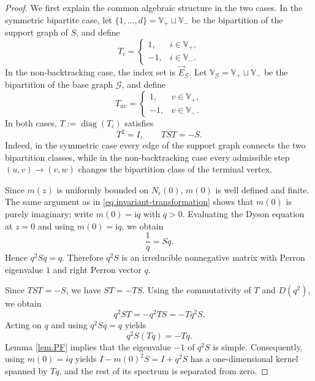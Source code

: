 \documentclass[11pt,twoside, a4paper]{article}
\numberwithin{equation}{section}
\numberwithin{figure}{section}
\theoremstyle{plain} %
\theoremstyle{definition}
\theoremstyle{remark}
\newcommand{\1} {\mspace{1 mu}}
\newcommand{\2} {\mspace{2 mu}}
\DeclareMathOperator{\diag}{diag}
\begin{document}
\begin{proof}
    We first explain the common algebraic structure in the two cases.
    In the symmetric bipartite case, let
    $
        \{1,\dots,d\}=\mathbb V_+\sqcup \mathbb{V}_-
    $
    be the bipartition of the support graph of \(S\), and define
    \[
        T_i=
        \begin{cases}
            1, & i\in\mathbb V_+,\\
            -1, & i\in\mathbb V_-.
        \end{cases}
    \]
    In the non-backtracking case, the index set is
    \(\vec E_{\mathcal G}\). Let 
    $
        \mathbb{V}_{\mathcal G}=\mathbb V_+\sqcup \mathbb V_-
    $
    be the bipartition of the base graph $\mathcal G$, and define
    \[
        T_{uv}
        =
        \begin{cases}
            1, & v\in\mathbb V_+,\\
            -1, & v\in\mathbb V_- .
        \end{cases}
    \]
    In both cases, \(T:=\diag(T_i)\) satisfies
    \begin{equation}\label{eq.period-two-structure}
        T^2=I,
        \qquad
        TST=-S .
    \end{equation}
    Indeed, in the symmetric case every edge of the support graph connects
    the two bipartition classes, while in the non-backtracking case every
    admissible step
    $
        (u,v)\to (v,w)
    $
    changes the bipartition class of the terminal vertex.


    Since $m(z)$ is uniformly bounded on $N_\epsilon(0)$, $m(0)$ is well defined and finite. 
    The same argument as in \eqref{eq.invariant-transformation} shows that \(m(0)\) is purely imaginary; write $m(0)=\mathrm iq$ with $q>0$.
    Evaluating the Dyson equation at \(z=0\) and using \(m(0)=\mathrm i q\), we obtain
    \[
        \frac1q = Sq .
    \]
    Hence
    $
        q^2S q=q.
    $
    Therefore \(q^2S\) is an irreducible nonnegative matrix with Perron eigenvalue \(1\) and right Perron vector \(q\).

    Since \(TST=-S\), we have $ST=-TS$. Using the commutativity of \(T\) and \(D(q^2)\), we obtain
    \[
        q^2 S T = -q^2TS = -Tq^2S .
    \]   
    Acting on $q$ and using $q^2Sq=q$ yields
    \[
        q^2S(Tq)=-Tq .
    \]
    Lemma \ref{lem.PF} implies that the eigenvalue \(-1\) of \(q^2S\) is simple. Consequently, using $m(0)=iq$ yields
    $
        I-m(0)^2S
        =
        I+q^2S
    $
    has a one-dimensional kernel spanned by \(Tq\), and the rest of its
    spectrum is separated from zero.


\end{proof}
\end{document}
